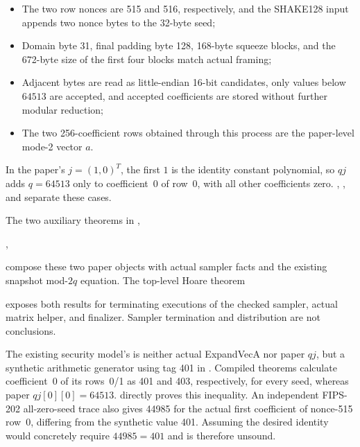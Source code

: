 \begin{itemize}
  \item The two row nonces are 515 and 516, respectively, and the SHAKE128
        input appends two nonce bytes to the 32-byte seed;
  \item Domain byte 31, final padding byte 128, 168-byte squeeze blocks, and
        the 672-byte size of the first four blocks match actual framing;
  \item Adjacent bytes are read as little-endian 16-bit candidates, only
        values below \(64513\) are accepted, and accepted coefficients are
        stored without further modular reduction;
  \item The two 256-coefficient rows obtained through this process are the
        paper-level mode-2 vector \(a\).
\end{itemize}

In the paper's \(j=(1,0)^T\), the first \(1\) is the identity constant
polynomial, so \(qj\) adds \(q=64513\) only to coefficient~0 of row~0, with all
other coefficients zero. ,
, and 
separate these cases.

The two auxiliary theorems in
\allowbreak
{},
\begin{center}
\small
{},\qquad
{}
\end{center}
compose these two paper objects with actual sampler facts and the existing
snapshot mod-\(2q\) equation. The top-level Hoare theorem
\begin{center}
\small
{}
\end{center}
exposes both results for terminating executions of the checked sampler, actual
matrix helper, and finalizer. Sampler termination and distribution are not
conclusions.

\begin{boundary}
The existing security model's  is neither
actual ExpandVecA nor paper \(qj\), but a synthetic arithmetic generator using
tag 401 in . Compiled theorems calculate
coefficient~0 of its rows~0/1 as 401 and 403, respectively, for every seed,
whereas paper \(qj[0][0]=64513\).
 directly proves this inequality.
An independent FIPS-202 all-zero-seed trace also gives 44985 for the actual first
coefficient of nonce-515 row~0, differing from the synthetic value 401.
Assuming the desired identity would concretely require \(44985=401\) and is
therefore unsound.
\end{boundary}

